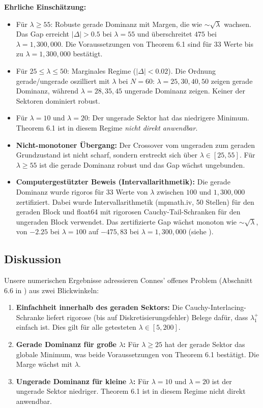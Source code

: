 \documentclass[12pt,a4paper]{article}
\theoremstyle{definition}
\theoremstyle{remark}
\begin{document}
\medskip\noindent
\textbf{Ehrliche Einschätzung:}
\begin{itemize}
  \item Für $\lambda \geq 55$: Robuste gerade Dominanz mit Margen, die wie $\sim\!\sqrt{\lambda}$ wachsen. Das Gap erreicht $|\Delta| > 0.5$ bei $\lambda = 55$ und überschreitet $475$ bei $\lambda = 1{,}300{,}000$. Die Voraussetzungen von Theorem 6.1 sind für $33$ Werte bis zu $\lambda = 1{,}300{,}000$ bestätigt.
  \item Für $25 \leq \lambda \leq 50$: Marginales Regime ($|\Delta| < 0.02$). Die Ordnung gerade/ungerade oszilliert mit $\lambda$ bei $N = 60$: $\lambda = 25, 30, 40, 50$ zeigen gerade Dominanz, während $\lambda = 28, 35, 45$ ungerade Dominanz zeigen. Keiner der Sektoren dominiert robust.
  \item Für $\lambda = 10$ und $\lambda = 20$: Der ungerade Sektor hat das niedrigere Minimum. Theorem 6.1 ist in diesem Regime \emph{nicht direkt anwendbar}.
  \item \textbf{Nicht-monotoner Übergang:} Der Crossover vom ungeraden zum geraden Grundzustand ist nicht scharf, sondern erstreckt sich über $\lambda \in [25, 55]$. Für $\lambda \geq 55$ ist die gerade Dominanz robust und das Gap wächst ungebunden.
  \item \textbf{Computergestützter Beweis (Intervallarithmetik):} Die gerade Dominanz wurde rigoros für $33$ Werte von $\lambda$ zwischen $100$ und $1{,}300{,}000$ zertifiziert. Dabei wurde Intervallarithmetik (mpmath.iv, 50 Stellen) für den geraden Block und float64 mit rigorosen Cauchy-Tail-Schranken für den ungeraden Block verwendet. Das zertifizierte Gap wächst monoton wie $\sim\!\sqrt{\lambda}$, von $-2.25$ bei $\lambda = 100$ auf $-475{,}83$ bei $\lambda = 1{,}300{,}000$ (siehe ).
\end{itemize}

\subsection{Diskussion}

Unsere numerischen Ergebnisse adressieren Connes' offenes Problem (Abschnitt 6.6 in \cite{Connes2025}) aus zwei Blickwinkeln:
\begin{enumerate}
  \item \textbf{Einfachheit innerhalb des geraden Sektors:} Die Cauchy-Interlacing-Schranke liefert rigorose (bis auf Diskretisierungsfehler) Belege dafür, dass $\lambda_1^+$ einfach ist. Dies gilt für alle getesteten $\lambda \in [5, 200]$.
  \item \textbf{Gerade Dominanz für große $\lambda$:} Für $\lambda \geq 25$ hat der gerade Sektor das globale Minimum, was beide Voraussetzungen von Theorem 6.1 bestätigt. Die Marge wächst mit $\lambda$.
  \item \textbf{Ungerade Dominanz für kleine $\lambda$:} Für $\lambda = 10$ und $\lambda = 20$ ist der ungerade Sektor niedriger. Theorem 6.1 ist in diesem Regime nicht direkt anwendbar.
\end{enumerate}
\end{document}

